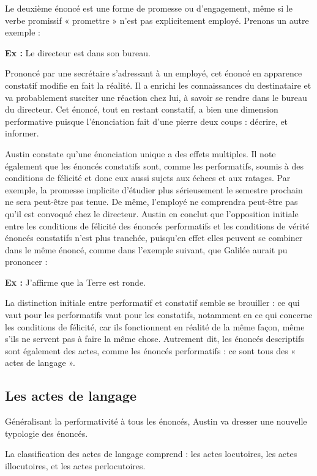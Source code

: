 Le deuxième énoncé est une forme de promesse ou d’engagement, même si le verbe promissif « promettre » n’est pas explicitement employé. Prenons un autre exemple :

\textbf{Ex :} Le directeur est dans son bureau.

Prononcé par une secrétaire s’adressant à un employé, cet énoncé en apparence constatif modifie en fait la réalité. Il a enrichi les connaissances du destinataire et va probablement susciter une réaction chez lui, à savoir se rendre dans le bureau du directeur. Cet énoncé, tout en restant constatif, a bien une dimension performative puisque l’énonciation fait d’une pierre deux coups : décrire, et informer.

Austin constate qu’une énonciation unique a des effets multiples. Il note également que les énoncés constatifs sont, comme les performatifs, soumis à des conditions de félicité et donc eux aussi sujets aux échecs et aux ratages. Par exemple, la promesse implicite d’étudier plus sérieusement le semestre prochain ne sera peut-être pas tenue. De même, l’employé ne comprendra peut-être pas qu’il est convoqué chez le directeur. Austin en conclut que l’opposition initiale entre les conditions de félicité des énoncés performatifs et les conditions de vérité énoncés constatifs n’est plus tranchée, puisqu’en effet elles peuvent se combiner dans le même énoncé, comme dans l’exemple suivant, que Galilée aurait pu prononcer :

\textbf{Ex :} J’affirme que la Terre est ronde.

La distinction initiale entre performatif et constatif semble se brouiller : ce qui vaut pour les performatifs vaut pour les constatifs, notamment en ce qui concerne les conditions de félicité, car ils fonctionnent en réalité de la même façon, même s’ils ne servent pas à faire la même chose. Autrement dit, les énoncés descriptifs sont également des actes, comme les énoncés performatifs : ce sont tous des « actes de langage ».

\subsection{Les actes de langage}
Généralisant la performativité à tous les énoncés, Austin va dresser une nouvelle typologie des énoncés.

La classification des actes de langage comprend : les actes locutoires, les actes illocutoires, et les actes perlocutoires.

